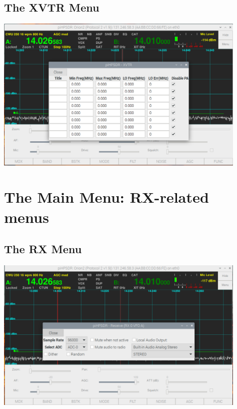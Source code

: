 \documentclass[12pt]{book}
\begin{document}
\section{The XVTR Menu}
\begin{center}
\includegraphics[width=12cm]{XVTRMenu.png}
\end{center}

\chapter{The Main Menu: RX-related menus}

\section{The RX Menu}
\begin{center}
\includegraphics[width=12cm]{RXMenu.png}
\end{center}
\end{document}
